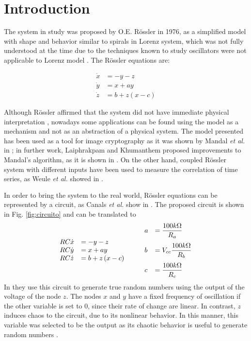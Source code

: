 \section{Introduction}
The system in study was proposed by O.E. R\"ossler  in 1976, as a simplified model with shape and behavior similar to spirals in Lorenz system, which was not fully understood at the time due to the techniques known to study oscillators were not applicable to Lorenz model \cite{rossler1976equation}. The R\"ossler equations are:

\begin{equation}
	\begin{array}{ll}
            \dot{x}&=-y-z\\
            \dot{y}&=x+ay\\
            \dot{z}&=b+z\left(x-c\right)
    \end{array}
\end{equation}

Although R\"ossler affirmed that the system did not have immediate physical interpretation \cite{rossler1976equation}, nowadays some applications can be found using the model as a mechanism and not as an abstraction of a physical system. The model presented has been used as a tool for image cryptography as it was shown by Mandal \textit{et al.} in  \cite{mandal2014symmetric}; in further work, Laiphrakpam and Khumanthem proposed improvements to Mandal's algorithm, as it is shown in \cite{laiphrakpam2017cryptanalysis}. On the other hand, coupled R\"ossler system with different inputs have been used to measure the correlation of time series, as Weule \textit{et al.} showed in \cite{weule1998detection}.

In order to bring the system to the real world, R\"ossler equations can be represented by a circuit, as Canals \textit{et al.} show in \cite{canals2014random}. The proposed circuit is shown in Fig. \ref{fig:circuito} and can be translated to 
\begin{equation}
	\begin{array}{ll}
            RC\dot{x}&=-y-z\\
            RC\dot{y}&=x+ay\\
            RC\dot{z}&=b+z\left(x-c\right)
    \end{array}\quad\quad\begin{array}{ll}
            a &= \dfrac{100k\Omega}{R_a}\vspace{2.5mm}\\
            b &= V_{cc}\dfrac{100k\Omega}{R_b}\vspace{2.5mm}\\
            c &= \dfrac{100k\Omega}{R_c}
    \end{array}\label{eq:circ}
\end{equation}
In \cite{canals2014random} they use this circuit to generate true random numbers using the output of the voltage of the node $z$. The nodes $x$ and $y$ have a fixed frequency of oscillation if the other variable is set to 0, since their rate of change are linear. In contrast, $z$ induces chaos to the circuit, due to its nonlinear behavior. In this manner, this variable was selected to be the output as its chaotic behavior is useful to generate random numbers \cite{canals2014random}.

